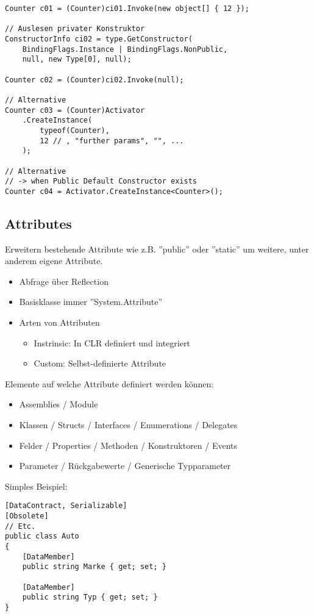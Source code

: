 \begin{multicols*}{2}
\begin{lstlisting}
Counter c01 = (Counter)ci01.Invoke(new object[] { 12 });

// Auslesen privater Konstruktor
ConstructorInfo ci02 = type.GetConstructor(
    BindingFlags.Instance | BindingFlags.NonPublic,
    null, new Type[0], null);

Counter c02 = (Counter)ci02.Invoke(null);

// Alternative
Counter c03 = (Counter)Activator
    .CreateInstance(
        typeof(Counter),
        12 // , "further params", "", ...
    );

// Alternative
// -> when Public Default Constructor exists
Counter c04 = Activator.CreateInstance<Counter>();
\end{lstlisting}

\subsection{Attributes}
Erweitern bestehende Attribute wie z.B. ''public'' oder ''static'' um weitere, unter anderem eigene Attribute.
\begin{itemize}
    \item Abfrage über Reflection
    \item Basisklasse immer ''System.Attribute''
    \item Arten von Attributen
    \begin{itemize}
        \item Instrinsic: In CLR definiert und integriert
        \item Custom: Selbst-definierte Attribute
    \end{itemize}
\end{itemize}
\vspace*{2mm}
Elemente auf welche Attribute definiert werden können:
\begin{itemize}
    \item Assemblies / Module
    \item Klassen / Structs / Interfaces / Enumerations / Delegates
    \item Felder / Properties / Methoden / Konstruktoren / Events
    \item Parameter / Rückgabewerte / Generische Typparameter
\end{itemize}
Simples Beispiel:
\begin{lstlisting}
[DataContract, Serializable] 
[Obsolete]
// Etc.
public class Auto
{
    [DataMember]
    public string Marke { get; set; }
    
    [DataMember]
    public string Typ { get; set; }
}
\end{lstlisting}

\end{multicols*}
